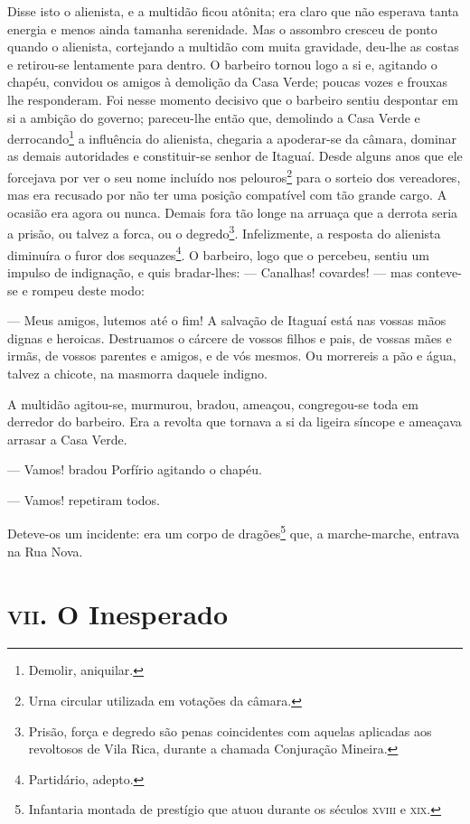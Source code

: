 Disse isto o alienista, e a multidão ficou atônita; era claro que não
esperava tanta energia e menos ainda tamanha serenidade. Mas o assombro
cresceu de ponto quando o alienista, cortejando a multidão com muita
gravidade, deu-lhe as costas e retirou-se lentamente para dentro. O
barbeiro tornou logo a si e, agitando o chapéu, convidou os amigos à
demolição da Casa Verde; poucas vozes e frouxas lhe responderam. Foi
nesse momento decisivo que o barbeiro sentiu despontar em si a ambição
do governo; pareceu-lhe então que, demolindo a Casa Verde e
derrocando\footnote{Demolir, aniquilar.} a influência do alienista,
chegaria a apoderar-se da câmara, dominar as demais autoridades e
constituir-se senhor de Itaguaí. Desde alguns anos que ele forcejava por
ver o seu nome incluído nos pelouros\footnote{Urna circular utilizada em
  votações da câmara.} para o sorteio dos vereadores, mas era recusado
por não ter uma posição compatível com tão grande cargo. A ocasião era
agora ou nunca. Demais fora tão longe na arruaça que a derrota seria a
prisão, ou talvez a forca, ou o degredo\footnote{Prisão, força e degredo
  são penas coincidentes com aquelas aplicadas aos revoltosos de Vila
  Rica, durante a chamada Conjuração Mineira.}. Infelizmente, a resposta
do alienista diminuíra o furor dos sequazes\footnote{Partidário, adepto.}.
O barbeiro, logo que o percebeu, sentiu um impulso de indignação, e quis
bradar-lhes: --- Canalhas! covardes! --- mas conteve-se e rompeu deste
modo:

--- Meus amigos, lutemos até o fim! A salvação de Itaguaí está nas
vossas mãos dignas e heroicas. Destruamos o cárcere de vossos filhos e
pais, de vossas mães e irmãs, de vossos parentes e amigos, e de vós
mesmos. Ou morrereis a pão e água, talvez a chicote, na masmorra daquele
indigno.

A multidão agitou-se, murmurou, bradou, ameaçou, congregou-se toda em
derredor do barbeiro. Era a revolta que tornava a si da ligeira síncope
e ameaçava arrasar a Casa Verde.

--- Vamos! bradou Porfírio agitando o chapéu.

--- Vamos! repetiram todos.

Deteve-os um incidente: era um corpo de dragões\footnote{Infantaria
  montada de prestígio que atuou durante os séculos \textsc{xviii} e \textsc{xix}.} que, a
marche-marche, entrava na Rua Nova.

\section*{\textsc{vii}. O Inesperado}

